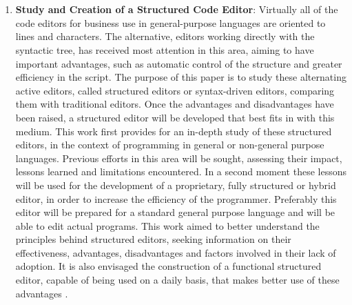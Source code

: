 

%


\chapter{}


\begin{englishtext}
\begin{enumerate}

    \item \textbf{Study and Creation of a Structured Code Editor}: Virtually all
    of the code editors for business use in general\hyp{}purpose languages are
    oriented to lines and characters. The alternative, editors working directly
    with the syntactic tree, has received most attention in this area, aiming to
    have important advantages, such as automatic control of the structure and
    greater efficiency in the script. The purpose of this paper is to study
    these alternating active editors, called structured editors or syntax-driven
    editors, comparing them with traditional editors. Once the advantages and
    disadvantages have been raised, a structured editor will be developed that
    best fits in with this medium. This work first provides for an in-depth
    study of these structured editors, in the context of programming in general
    or non-general purpose languages. Previous efforts in this area will be
    sought, assessing their impact, lessons learned and limitations encountered.
    In a second moment these lessons will be used for the development of a
    proprietary, fully structured or hybrid editor, in order to increase the
    efficiency of the programmer. Preferably this editor will be prepared for a
    standard general purpose language and will be able to edit actual programs.
    This work aimed to better understand the principles behind structured
    editors, seeking information on their effectiveness, advantages,
    disadvantages and factors involved in their lack of adoption. It is also
    envisaged the construction of a functional structured editor, capable of
    being used on a daily basis, that makes better use of these advantages
    \cite{structuredEditorStudy}.


\end{enumerate}
\end{englishtext}
